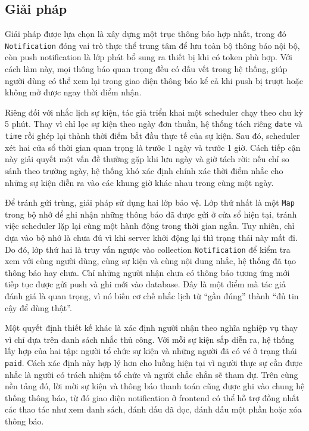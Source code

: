 \documentclass[../DoAn.tex]{subfiles}
\begin{document}
\subsection{Giải pháp}
Giải pháp được lựa chọn là xây dựng một trục thông báo hợp nhất, trong đó \texttt{Notification} đóng vai trò thực thể trung tâm để lưu toàn bộ thông báo nội bộ, còn push notification là lớp phát bổ sung ra thiết bị khi có token phù hợp. Với cách làm này, mọi thông báo quan trọng đều có dấu vết trong hệ thống, giúp người dùng có thể xem lại trong giao diện thông báo kể cả khi push bị trượt hoặc không mở được ngay thời điểm nhận.

Riêng đối với nhắc lịch sự kiện, tác giả triển khai một scheduler chạy theo chu kỳ 5 phút. Thay vì chỉ lọc sự kiện theo ngày đơn thuần, hệ thống tách riêng \texttt{date} và \texttt{time} rồi ghép lại thành thời điểm bắt đầu thực tế của sự kiện. Sau đó, scheduler xét hai cửa sổ thời gian quan trọng là trước 1 ngày và trước 1 giờ. Cách tiếp cận này giải quyết một vấn đề thường gặp khi lưu ngày và giờ tách rời: nếu chỉ so sánh theo trường ngày, hệ thống khó xác định chính xác thời điểm nhắc cho những sự kiện diễn ra vào các khung giờ khác nhau trong cùng một ngày.

Để tránh gửi trùng, giải pháp sử dụng hai lớp bảo vệ. Lớp thứ nhất là một \texttt{Map} trong bộ nhớ để ghi nhận những thông báo đã được gửi ở cửa sổ hiện tại, tránh việc scheduler lặp lại cùng một hành động trong thời gian ngắn. Tuy nhiên, chỉ dựa vào bộ nhớ là chưa đủ vì khi server khởi động lại thì trạng thái này mất đi. Do đó, lớp thứ hai là truy vấn ngược vào collection \texttt{Notification} để kiểm tra xem với cùng người dùng, cùng sự kiện và cùng nội dung nhắc, hệ thống đã tạo thông báo hay chưa. Chỉ những người nhận chưa có thông báo tương ứng mới tiếp tục được gửi push và ghi mới vào database. Đây là một điểm mà tác giả đánh giá là quan trọng, vì nó biến cơ chế nhắc lịch từ “gần đúng” thành “đủ tin cậy để dùng thật”.

Một quyết định thiết kế khác là xác định người nhận theo nghĩa nghiệp vụ thay vì chỉ dựa trên danh sách nhắc thủ công. Với mỗi sự kiện sắp diễn ra, hệ thống lấy hợp của hai tập: người tổ chức sự kiện và những người đã có vé ở trạng thái \texttt{paid}. Cách xác định này hợp lý hơn cho luồng hiện tại vì người thực sự cần được nhắc là người có trách nhiệm tổ chức và người chắc chắn sẽ tham dự. Trên cùng nền tảng đó, lời mời sự kiện và thông báo thanh toán cũng được ghi vào chung hệ thống thông báo, từ đó giao diện notification ở frontend có thể hỗ trợ đồng nhất các thao tác như xem danh sách, đánh dấu đã đọc, đánh dấu một phần hoặc xóa thông báo.
\end{document}
